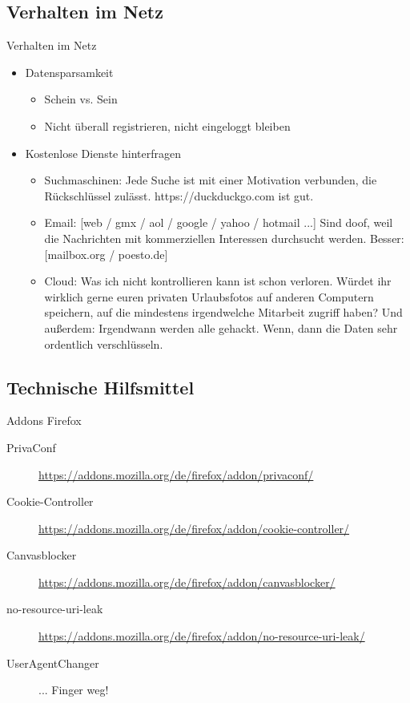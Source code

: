 \documentclass[utf8]{beamer}
\begin{document}
	\subsection{Verhalten im Netz}
	\begin{frame}{Verhalten im Netz}
		\begin{itemize}
			\item Datensparsamkeit
			\begin{itemize}
				\item Schein vs. Sein
				\item Nicht überall registrieren, nicht eingeloggt bleiben
			\end{itemize}
			\item Kostenlose Dienste hinterfragen
			\begin{itemize}
				\item Suchmaschinen:
				Jede Suche ist mit einer Motivation verbunden, die Rückschlüssel zulässt. https://duckduckgo.com ist gut.
				\item Email:
				[web / gmx / aol / google / yahoo / hotmail ...] Sind doof, weil die Nachrichten mit kommerziellen Interessen durchsucht werden. Besser: [mailbox.org / poesto.de]
				\item Cloud:
				Was ich nicht kontrollieren kann ist schon verloren. Würdet ihr wirklich gerne euren privaten Urlaubsfotos auf anderen Computern speichern, auf die mindestens irgendwelche Mitarbeit zugriff haben? Und außerdem: Irgendwann werden alle gehackt. Wenn, dann die Daten sehr ordentlich verschlüsseln.
			\end{itemize}
		\end{itemize}
	\end{frame}
	
	\subsection{Technische Hilfsmittel}
	\begin{frame}{Addons Firefox}
		\noindent
		\begin{description}
			\item[PrivaConf] \url{https://addons.mozilla.org/de/firefox/addon/privaconf/}
			\item[Cookie-Controller] \url{https://addons.mozilla.org/de/firefox/addon/cookie-controller/}
			\item[Canvasblocker] \url{https://addons.mozilla.org/de/firefox/addon/canvasblocker/}
			\item[no-resource-uri-leak] \url{https://addons.mozilla.org/de/firefox/addon/no-resource-uri-leak/}
			\item[UserAgentChanger]{... Finger weg!}
		\end{description}
	\end{frame}
	
\end{document}
